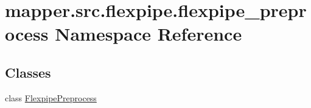 \hypertarget{namespacemapper_1_1src_1_1flexpipe_1_1flexpipe__preprocess}{}\section{mapper.\+src.\+flexpipe.\+flexpipe\+\_\+preprocess Namespace Reference}
\label{namespacemapper_1_1src_1_1flexpipe_1_1flexpipe__preprocess}
\subsection*{Classes}
\begin{DoxyCompactItemize}
\item 
class \hyperlink{classmapper_1_1src_1_1flexpipe_1_1flexpipe__preprocess_1_1_flexpipe_preprocess}{Flexpipe\+Preprocess}
\end{DoxyCompactItemize}
